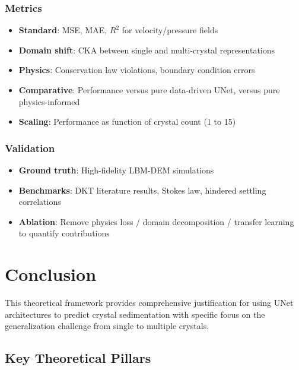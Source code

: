 \subsection{Metrics}
\begin{itemize}
    \item \textbf{Standard}: MSE, MAE, $R^2$ for velocity/pressure fields
    \item \textbf{Domain shift}: CKA between single and multi-crystal representations
    \item \textbf{Physics}: Conservation law violations, boundary condition errors
    \item \textbf{Comparative}: Performance versus pure data-driven UNet, versus pure physics-informed
    \item \textbf{Scaling}: Performance as function of crystal count (1 to 15)
\end{itemize}

\subsection{Validation}
\begin{itemize}
    \item \textbf{Ground truth}: High-fidelity LBM-DEM simulations
    \item \textbf{Benchmarks}: DKT literature results, Stokes law, hindered settling correlations
    \item \textbf{Ablation}: Remove physics loss / domain decomposition / transfer learning to quantify contributions
\end{itemize}

\chapter{Conclusion}

This theoretical framework provides comprehensive justification for using UNet architectures to predict crystal sedimentation with specific focus on the generalization challenge from single to multiple crystals.

\section{Key Theoretical Pillars}

